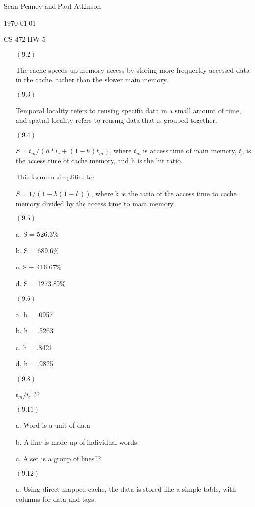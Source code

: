 \documentclass[letterpaper,10pt,titlepage]{article}
\def\name{Sean Penney and Paul Atkinson}
\begin{document}
\hfill \name

\hfill \today

\hfill CS 472 HW 5

\begin{enumerate}
\item[$(9.2)$] 

  The cache speeds up memory access by storing more frequently accessed data in the cache, rather than the slower main memory.

\item[$(9.3)$]

  Temporal locality refers to reusing specific data in a small amount of time, and spatial locality refers to reusing data that is grouped together.    

\item[$(9.4)$]

  $S = t_{m} / (h * t_{c} + (1 - h)t_{m})$, where $t_{m}$ is access time of main memory, $t_{c}$ is the access time of cache memory, and h is the hit ratio.
 
  This formula simplifies to:
 
  $S = 1 / (1 - h(1 - k))$, where k is the ratio of the access time to cache memory divided by the access time to main memory.
  
\item[$(9.5)$]
  
  a.  S = 526.3\%
 
  b.  S = 689.6\%
 
  c.  S = 416.67\%
 
  d.  S = 1273.89\%
  
\item[$(9.6)$]

  a.  h = .0957
 
  b.  h = .5263
 
  c.  h = .8421
 
  d.  h = .9825

\item[$(9.8)$]
  
  $t_{m} / t_{c}$ ??
  
\item[$(9.11)$]   
  
  a.  Word is a unit of data
  
  b.  A line is made up of individual words.
  
  c.  A set is a group of lines??
  
\item[$(9.12)$]
  
  a.  Using direct mapped cache, the data is stored like a simple table, with columns for data and tags.
 

\end{enumerate}
\end{document}
